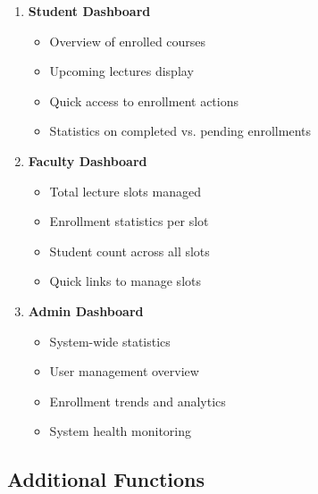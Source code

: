 \documentclass[12pt,a4paper]{report}
\begin{document}
\begin{enumerate}[leftmargin=*]
    \item \textbf{Student Dashboard}
    \begin{itemize}
        \item Overview of enrolled courses
        \item Upcoming lectures display
        \item Quick access to enrollment actions
        \item Statistics on completed vs. pending enrollments
    \end{itemize}
    
    \item \textbf{Faculty Dashboard}
    \begin{itemize}
        \item Total lecture slots managed
        \item Enrollment statistics per slot
        \item Student count across all slots
        \item Quick links to manage slots
    \end{itemize}
    
    \item \textbf{Admin Dashboard}
    \begin{itemize}
        \item System-wide statistics
        \item User management overview
        \item Enrollment trends and analytics
        \item System health monitoring
    \end{itemize}
\end{enumerate}

\subsection{Additional Functions}
\end{document}

